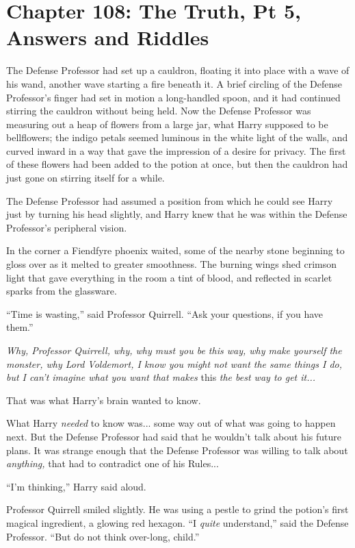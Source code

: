 \chapter{Chapter 108: The Truth, Pt 5, Answers and Riddles}
The Defense Professor had set up a cauldron, floating it into place with a wave of his wand, another wave starting a fire beneath it. A brief circling of the Defense Professor's finger had set in motion a long-handled spoon, and it had continued stirring the cauldron without being held. Now the Defense Professor was measuring out a heap of flowers from a large jar, what Harry supposed to be bellflowers; the indigo petals seemed luminous in the white light of the walls, and curved inward in a way that gave the impression of a desire for privacy. The first of these flowers had been added to the potion at once, but then the cauldron had just gone on stirring itself for a while.

The Defense Professor had assumed a position from which he could see Harry just by turning his head slightly, and Harry knew that he was within the Defense Professor's peripheral vision.

In the corner a Fiendfyre phoenix waited, some of the nearby stone beginning to gloss over as it melted to greater smoothness. The burning wings shed crimson light that gave everything in the room a tint of blood, and reflected in scarlet sparks from the glassware.

``Time is wasting,'' said Professor Quirrell. ``Ask your questions, if you have them.''

\emph{Why, Professor Quirrell, why, why must you be this way, why make yourself the monster, why Lord Voldemort, I know you might not want the same things I do, but I can't imagine what you want that makes} this \emph{the best way to get it...}

That was what Harry's brain wanted to know.

What Harry \emph{needed} to know was... some way out of what was going to happen next. But the Defense Professor had said that he wouldn't talk about his future plans. It was strange enough that the Defense Professor was willing to talk about \emph{anything,} that had to contradict one of his Rules...

``I'm thinking,'' Harry said aloud.

Professor Quirrell smiled slightly. He was using a pestle to grind the potion's first magical ingredient, a glowing red hexagon. ``I \emph{quite} understand,'' said the Defense Professor. ``But do not think over-long, child.''

